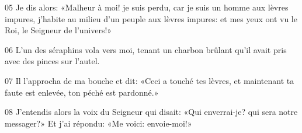 
05 Je dis alors: «Malheur à moi! je suis perdu, car je suis un homme aux lèvres impures, j’habite au milieu d’un peuple aux lèvres impures: et mes yeux ont vu le Roi, le Seigneur de l’univers!»

06 L’un des séraphins vola vers moi, tenant un charbon brûlant qu’il avait pris avec des pinces sur l’autel.

07 Il l’approcha de ma bouche et dit: «Ceci a touché tes lèvres, et maintenant ta faute est enlevée, ton péché est pardonné.»

08 J’entendis alors la voix du Seigneur qui disait: «Qui enverrai-je? qui sera notre messager?» Et j’ai répondu: «Me voici: envoie-moi!»
